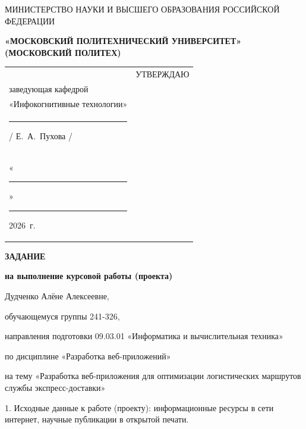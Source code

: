 \documentclass[14pt, a4paper]{extarticle}
\begin{document}
\pagestyle{empty}


\begin{center}
    {\small МИНИСТЕРСТВО НАУКИ И ВЫСШЕГО ОБРАЗОВАНИЯ РОССИЙСКОЙ ФЕДЕРАЦИИ}


    {\small \textbf{«МОСКОВСКИЙ ПОЛИТЕХНИЧЕСКИЙ УНИВЕРСИТЕТ»}} \\
    {\small \textbf{(МОСКОВСКИЙ ПОЛИТЕХ)}}
\end{center}

\begin{tabularx}{\textwidth}{@{} p{} p{} @{}}
     &
    \raggedright
    УТВЕРЖДАЮ                          \\
    заведующая кафедрой                \\
    «Инфокогнитивные технологии»       \\[0.3cm]

    \rule{3cm}{0.4pt} / Е.~А.~Пухова / \\[0.1cm]

    «\rule{0.8cm}{0.4pt}» \rule{3cm}{0.4pt} 2026~г.
\end{tabularx}


\begin{center}

    { \large \textbf{ЗАДАНИЕ}}

    \textbf{на выполнение курсовой работы (проекта)}

    Дудченко Алёне Алексеевне, %

\end{center}

обучающемуся группы 241-326,

направления подготовки 09.03.01 «Информатика и вычислительная техника»

по дисциплине «Разработка веб-приложений»

на тему «Разработка веб-приложения для оптимизации логистических
маршрутов службы экспресс-доставки»

1. Исходные данные к работе (проекту): информационные ресурсы в сети
интернет, научные публикации в открытой печати.
\end{document}
